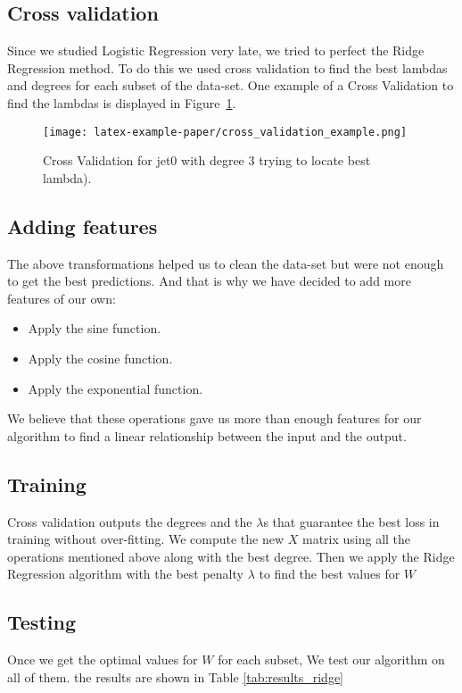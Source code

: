 \documentclass[10pt,conference,compsocconf]{IEEEtran}
\begin{document}
\subsection{Cross validation}
Since we studied Logistic Regression very late, we tried to perfect the Ridge Regression method. To do this we used cross validation to find the best lambdas and degrees for each subset of the data-set. One example of a Cross Validation to find the lambdas is displayed in Figure~\ref{fig:cross_validation}.
\begin{figure}[htbp]
  \centering
  \texttt{[image: latex-example-paper/cross\_validation\_example.png]}
  \vspace{-7mm}
  \caption{Cross Validation for jet0 with degree 3 trying to locate best lambda).}
  \vspace{-3mm}
  \label{fig:cross_validation}
\end{figure}

\subsection{Adding features}
The above transformations helped us to clean the data-set but were not enough to get the best predictions. And that is why we have decided to add more features of our own:
\begin{itemize}
\item Apply the sine function.
\item Apply the cosine function.
\item Apply the exponential function.
\end{itemize}

We believe that these operations gave us more than enough features for our algorithm to find a linear relationship between the input and the output.

\subsection{Training}
Cross validation outputs the degrees and the $\lambda$s that guarantee the best loss in training without over-fitting.
We compute the new $X$ matrix using all the operations mentioned above along with the best degree. Then we apply the Ridge Regression algorithm with the best penalty $\lambda$ to find the best values for $W$
\subsection{Testing}
Once we get the optimal values for $W$ for each subset, We test our algorithm on all of them. the results are shown in Table \ref{tab:results_ridge}
\end{document}
